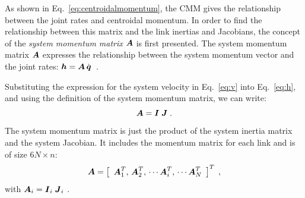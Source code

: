 \documentclass{llncs}
\newcommand{\bA}{\mbox{\boldmath $A$}}
\newcommand{\bI}{\mbox{\boldmath $I$}}
\newcommand{\bJ}{\mbox{\boldmath $J$}}
\newcommand{\bh}{\mbox{\boldmath $h$}}
\newcommand{\bq}{\mbox{\boldmath $q$}}
\newcommand{\bqd}{\dot{\bq}}
\begin{document}


As shown in Eq.~\ref{eq:centroidalmomentum}, the CMM
gives the relationship between the joint rates and centroidal momentum.
In order to find the relationship between this matrix and the link
inertias and Jacobians, the concept of the \emph{system momentum
matrix} $\bA$ is first presented. The system momentum matrix
$\bA$ expresses the relationship between the
system momentum vector and the joint rates:
$\bh = \bA \, \bqd$~.

Substituting the expression for the system velocity
in Eq.~\ref{eq:v} into Eq.~\ref{eq:h},
%
%
and using the definition of the system momentum matrix, we can write:
%
\begin{equation}\label{eq:a}
\bA = \bI \; \bJ \; .\\
\end{equation}
%
The system momentum matrix is just the product of the system inertia
matrix and the system Jacobian. It includes the momentum matrix for
each link and is of size $6N \times n$:
%
\begin{equation}\label{eq:A}
\bA = \left[ \begin{array}{c} \bA_1^T, \, \bA_2^T, \, \cdots \bA_i^T, \, \cdots \bA_N^T \end{array} \right]^T \; ,
\end{equation}
%
with
%
$\bA_i = \bI_i \; \bJ_i$ .
%


%
\end{document}
